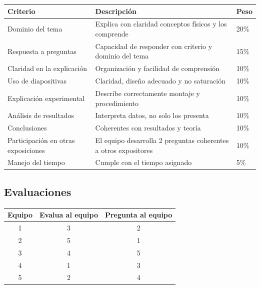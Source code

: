 \begin{longtable}{|p{5cm}|p{7cm}|p{2cm}|}
\hline
\textbf{Criterio} & \textbf{Descripción} & \textbf{Peso} \\
\hline
Dominio del tema & Explica con claridad conceptos físicos y los comprende & 20\% \\
\hline
Respuesta a preguntas & Capacidad de responder con criterio y dominio del tema & 15\% \\
\hline
Claridad en la explicación & Organización y facilidad de comprensión & 10\% \\
\hline
Uso de diapositivas & Claridad, diseño adecuado y no saturación & 10\% \\
\hline
Explicación experimental & Describe correctamente montaje y procedimiento & 10\% \\
\hline
Análisis de resultados & Interpreta datos, no solo los presenta & 10\% \\
\hline
Conclusiones & Coherentes con resultados y teoría & 10\% \\
\hline
Participación en otras exposiciones & El equipo desarrolla 2 preguntas coherentes a otros expositores & 10\% \\
\hline
Manejo del tiempo & Cumple con el tiempo asignado & 5\% \\
\hline
\end{longtable}

\subsection{Evaluaciones}

\begin{table}[H]
\centering
\begin{tabular}{|c|c|c|}
\hline
\textbf{Equipo} & \textbf{Evalua al equipo} & \textbf{Pregunta al equipo} \\ \hline
1      & 3                 & 2                   \\ \hline
2      & 5                 & 1                   \\ \hline
3      & 4                 & 5                   \\ \hline
4      & 1                 & 3                   \\ \hline
5      & 2                 & 4                   \\ \hline
\end{tabular}
\end{table}